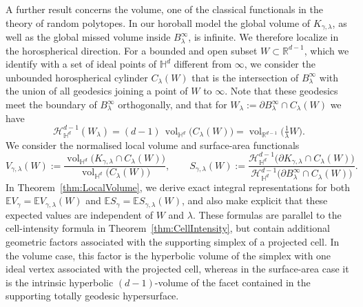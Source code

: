 \documentclass[11pt,a4paper]{article}
\theoremstyle{plain}
\theoremstyle{definition}
\theoremstyle{remark}
\newcommand{\vol}{\mathop{\mathrm{vol}}\nolimits}
\def\EE{\mathbb{E}}
\def\HH{\mathbb{H}}
\def\RR{\mathbb{R}}
\def\cH{\mathcal{H}}
\begin{document}
A further result concerns the volume, one of the classical functionals in
the theory of random polytopes. In our horoball model the global volume of
$K_{\gamma,\lambda}$, as well as the global missed volume inside
$B_\lambda^\infty$, is infinite. We therefore localize in the horospherical direction. For a bounded and open
subset $W\subset\RR^{d-1}$, which we identify with a set of ideal points of $\HH^d$ different from $\infty$, we consider the unbounded horospherical cylinder $C_\lambda(W)$ that is the intersection of $B_\lambda^\infty$ with the union of all geodesics joining a point of $W$ to $\infty$.
Note that these geodesics meet the boundary of $B_\lambda^\infty$ orthogonally, and that for $W_\lambda:=\partial B_\lambda^\infty\cap C_\lambda(W)$ we have
\begin{equation}
	\label{eqn:VolumeCylinder}
	\cH_{\HH^d}^{d-1}(W_\lambda) = (d-1)\, \vol_{\HH^d}\bigl(C_\lambda(W)\bigr)  = \vol_{\RR^{d-1}}\bigl(\tfrac{1}{\lambda} W\bigr).
\end{equation}
We consider the normalised
local volume and surface-area functionals
\begin{equation}\label{def:local_vol}
	V_{\gamma,\lambda}(W)
	:=
	\frac{
		\vol_{\HH^d}\bigl(
		K_{\gamma,\lambda}\cap C_\lambda(W)
		\bigr)
	}{
		\vol_{\HH^d}\bigl(C_\lambda(W)\bigr)
	},
	\qquad
	S_{\gamma,\lambda}(W)
	:=
	\frac{
		\cH_{\HH^d}^{d-1}\bigl(
		\partial K_{\gamma,\lambda}\cap C_\lambda(W)
		\bigr)
	}{
		\cH_{\HH^d}^{d-1}\bigl(
		\partial B_\lambda^\infty \cap C_\lambda(W)
		\bigr)
	}.
\end{equation}
In Theorem~\ref{thm:LocalVolume}, we derive exact integral representations
for both
$\EE V_\gamma = \EE V_{\gamma,\lambda}(W)$ and
$\EE S_\gamma = \EE S_{\gamma,\lambda}(W)$, and also make explicit that these expected values are independent of $W$ and $\lambda$.
These formulas are parallel to the
cell-intensity formula in Theorem~\ref{thm:CellIntensity}, but contain
additional geometric factors associated with the supporting simplex of a
projected cell. In the volume case, this factor is the hyperbolic volume of the simplex with one ideal vertex associated
with the projected cell, whereas in the
surface-area case it is the intrinsic hyperbolic $(d-1)$-volume of the
facet contained in the supporting totally geodesic hypersurface.
\end{document}
